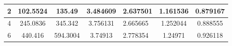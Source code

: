 \begin{table}[]
{\begin{tabular}{|c|c|c|c|l|c|c|}
2                                                                             & 102.5524                                                                                                                                                                                                                       & 135.49                                                                                                                                                                                                                       & 3.484609                                                                                                                        & 2.637501                                                                                                                                              & 1.161536                                                                                   & 0.879167                                                                                   \\ \hline
4                                                                             & 245.0836                                                                                                                                                                                                                       & 345.342                                                                                                                                                                                                                      & 3.756131                                                                                                                        & 2.665665                                                                                                                                              & 1.252044                                                                                   & 0.888555                                                                                   \\ \hline
6                                                                             & 440.416                                                                                                                                                                                                                        & 594.3004                                                                                                                                                                                                                     & 3.74913                                                                                                                         & 2.778354                                                                                                                                              & 1.24971                                                                                    & 0.926118                                                                                   \\ \hline

\end{tabular}}
\end{table}
